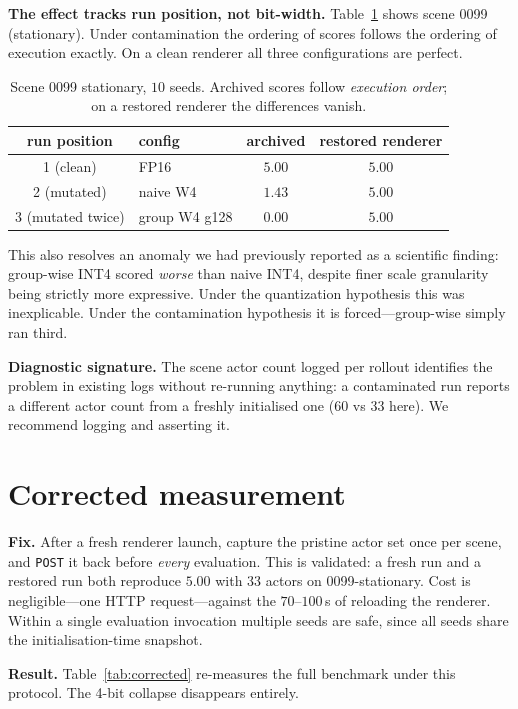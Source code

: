 \documentclass[conference]{IEEEtran}
\begin{document}
\textbf{The effect tracks run position, not bit-width.} Table~\ref{tab:position} shows scene 0099
(stationary). Under contamination the ordering of scores follows the ordering of execution
exactly. On a clean renderer all three configurations are perfect.

\begin{table}[t]\centering
\caption{Scene 0099 stationary, $10$ seeds. Archived scores follow \emph{execution order};
on a restored renderer the differences vanish.}
\label{tab:position}
\begin{tabular}{clcc}
\toprule
run position & config & archived & restored renderer \\
\midrule
1 (clean) & FP16 & $5.00$ & $5.00$ \\
2 (mutated) & naive W4 & $1.43$ & $\mathbf{5.00}$ \\
3 (mutated twice) & group W4 g128 & $0.00$ & $\mathbf{5.00}$ \\
\bottomrule
\end{tabular}
\end{table}

This also resolves an anomaly we had previously reported as a scientific finding: group-wise INT4
scored \emph{worse} than naive INT4, despite finer scale granularity being strictly more
expressive. Under the quantization hypothesis this was inexplicable. Under the contamination
hypothesis it is forced---group-wise simply ran third.

\textbf{Diagnostic signature.} The scene actor count logged per rollout identifies the problem in
existing logs without re-running anything: a contaminated run reports a different actor count from
a freshly initialised one ($60$ vs $33$ here). We recommend logging and asserting it.

\section{Corrected measurement}\label{sec:corrected}
\textbf{Fix.} After a fresh renderer launch, capture the pristine actor set once per scene, and
\texttt{POST} it back before \emph{every} evaluation. This is validated: a fresh run and a
restored run both reproduce $5.00$ with $33$ actors on 0099-stationary. Cost is negligible---one
HTTP request---against the $70$--$100$\,s of reloading the renderer. Within a single evaluation
invocation multiple seeds are safe, since all seeds share the initialisation-time snapshot.

\textbf{Result.} Table~\ref{tab:corrected} re-measures the full benchmark under this protocol.
The 4-bit collapse disappears entirely.
\end{document}
